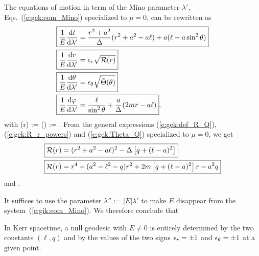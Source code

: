The equations of motion in term of the Mino parameter $\lambda'$,
Eqs.~(\ref{e:gek:eom_Mino}) specialized to $\mu=0$, can be rewritten as
\begin{subequations}
\label{e:gik:eom_Mino}
\begin{align}
& \fbox{$\displaystyle  \frac{1}{E} \frac{\mathrm{d} t}{\mathrm{d} \lambda'} = \frac{r^2 + a^2}{\Delta} (r^2 + a^2 - a \ell) + a ( \ell - a \sin^2\theta ) $} \label{e:gik:dtdl_Mino} \\
& \fbox{$\displaystyle  \frac{1}{E} \frac{\mathrm{d} r}{\mathrm{d} \lambda'} = \epsilon_r \sqrt{ \mathcal{R}(r) } $} \label{e:gik:drdl_Mino}\\
& \fbox{$\displaystyle  \frac{1}{E} \frac{\mathrm{d} \theta}{\mathrm{d} \lambda'} = \epsilon_\theta \sqrt{\tilde\Theta(\theta)} $} \label{e:gik:dthdl_Mino}\\
& \fbox{$\displaystyle  \frac{1}{E} \frac{\mathrm{d} \varphi}{\mathrm{d} \lambda'}  = \frac{\ell}{\sin^2\theta}
    + \frac{a}{\Delta}(2m r - a \ell) $} , \label{e:gik:dphdl_Mino}
\end{align}
\end{subequations}
with
\be
    (r) := 
    \qand
    \tilde\Theta(\th) :=  .
\ee
From the general expressions (\ref{e:gek:def_R_Q}), (\ref{e:gek:R_r_powers}) and (\ref{e:gek:Theta_Q}) specialized to $\mu=0$, we get
\begin{subequations}
\label{e:gik:mcR}
\begin{align}
    &\fbox{$\displaystyle \mathcal{R}(r) = (r^2 + a^2 - a \ell)^2 - \Delta \left[ q + (\ell -a)^2 \right] $}
      \label{e:gik:mcR_Delta}\\
    &\fbox{$\displaystyle \mathcal{R}(r) =  r^4 + (a^2 - \ell^2 - q) r^2 + 2m\left[ q + (\ell -a)^2 \right] r
    - a^2 q $} \label{e:gik:mcR_powers}
\end{align}
\end{subequations}
and
\be \label{e:gik:tTheta}
     .
\ee

It suffices to use the parameter $\lambda'' := |E| \lambda'$ to make $E$
disappear from the system~(\ref{e:gik:eom_Mino}). We therefore conclude that
\begin{greybox}
In Kerr spacetime, a null geodesic with $E\neq 0$  is entirely determined
by the two constants $(\ell,q)$ and by the values of the two signs $\epsilon_r=\pm 1$ and $\epsilon_\theta=\pm 1$
at a given point.
\end{greybox}

